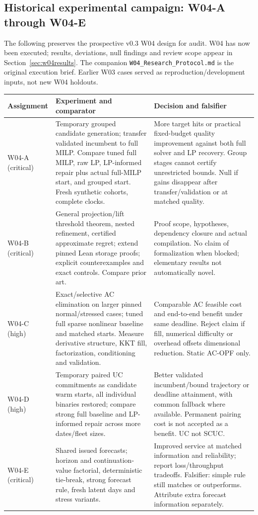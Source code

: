 \documentclass[11pt,letterpaper]{article}
\begin{document}
\subsection{Historical experimental campaign: W04-A through W04-E}
\label{sec:w04}
The following preserves the prospective v0.3 W04 design for audit. W04 has now been executed; results, deviations, null findings and review scope appear in Section~\ref{sec:w04results}. The companion \texttt{W04\_Research\_Protocol.md} is the original execution brief. Earlier W03 cases served as reproduction/development inputs, not new W04 holdouts.

\begin{longtable}{P{.14\linewidth}P{.41\linewidth}P{.36\linewidth}}
\toprule Assignment & Experiment and comparator & Decision and falsifier\\\midrule\endhead
W04-A (critical) & Temporary grouped candidate generation; transfer validated incumbent to full MILP. Compare tuned full MILP, raw LP, LP-informed repair plus actual full-MILP start, and grouped start. Fresh synthetic cohorts, complete clocks. & More target hits or practical fixed-budget quality improvement against both full solver and LP recovery. Group stages cannot certify unrestricted bounds. Null if gains disappear after transfer/validation or at matched quality.\\
W04-B (critical) & General projection/lift threshold theorem, nested refinement, certified approximate regret; extend pinned Lean storage proofs; explicit counterexamples and exact controls. Compare prior art. & Proof scope, hypotheses, dependency closure and actual compilation. No claim of formalization when blocked; elementary results not automatically novel.\\
W04-C (high) & Exact/selective AC elimination on larger pinned normal/stressed cases; tuned full sparse nonlinear baseline and matched starts. Measure derivative structure, KKT fill, factorization, conditioning and validation. & Comparable AC feasible cost and end-to-end benefit under same deadline. Reject claim if fill, numerical difficulty or overhead offsets dimensional reduction. Static AC-OPF only.\\
W04-D (high) & Temporary paired UC commitments as candidate warm starts, all individual binaries restored; compare strong full baseline and LP-informed repair across more dates/fleet sizes. & Better validated incumbent/bound trajectory or deadline attainment, with common fallback where available. Permanent pairing cost is not accepted as a benefit. UC not SCUC.\\
W04-E (critical) & Shared issued forecasts; horizon and continuation-value factorial, deterministic tie-break, strong forecast rule, fresh latent days and stress variants. & Improved service at matched information and reliability; report loss/throughput tradeoffs. Falsifier: simple rule still matches or outperforms. Attribute extra forecast information separately.\\
\bottomrule
\end{longtable}
\end{document}
